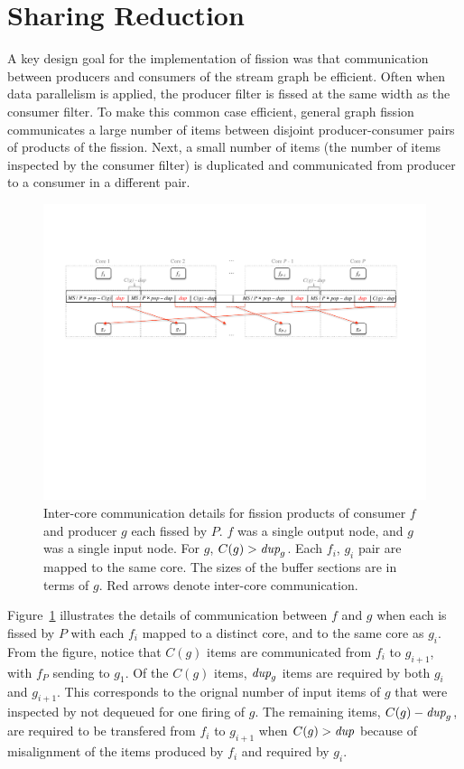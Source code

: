 \section{Sharing Reduction}

A key design goal for the implementation of fission was that
communication between producers and consumers of the stream graph be
efficient.  Often when data parallelism is applied, the producer
filter is fissed at the same width as the consumer filter.  To make
this common case efficient, general graph fission communicates a large
number of items between disjoint producer-consumer pairs of products
of the fission.  Next, a small number of items (the number of items
inspected by the consumer filter) is duplicated and communicated from
producer to a consumer in a different pair.

\begin{figure}[t]
\centering
\includegraphics[width=6in]{figures/remaining-dup-case.pdf}
\caption[Extra inter-core communication when $C(g) > \mt{dup}_g$.]
{Inter-core communication details for fission products of consumer $f$
  and producer $g$ each fissed by $P$.  $f$ was a single output node,
  and $g$ was a single input node.  For $g$, $C(g) > \mt{dup}_g$.
  Each $f_i$, $g_i$ pair are mapped to the same core.  The sizes of
  the buffer sections are in terms of $g$. Red arrows denote
  inter-core communication.  \label{fig:remaining-dup}}
\end{figure}

Figure~\ref{fig:remaining-dup} illustrates the details of
communication between $f$ and $g$ when each is fissed by $P$ with each
$f_i$ mapped to a distinct core, and to the same core as $g_i$.  From
the figure, notice that $C(g)$ items are communicated from $f_i$ to
$g_{i+ 1}$, with $f_P$ sending to $g_1$.  Of the $C(g)$ items,
$\mbox{\it dup}_g$ items are required by both $g_i$ and $g_{i+1}$.  This
corresponds to the orignal number of input items of $g$ that were
inspected by not dequeued for one firing of $g$.  The remaining items,
$C(g) - \mbox{\it dup}_g$, are required to be transfered from $f_i$ to
$g_{i+1}$ when $C(g) > \mbox{\it dup}$ because of misalignment of the items
produced by $f_i$ and required by $g_i$.


